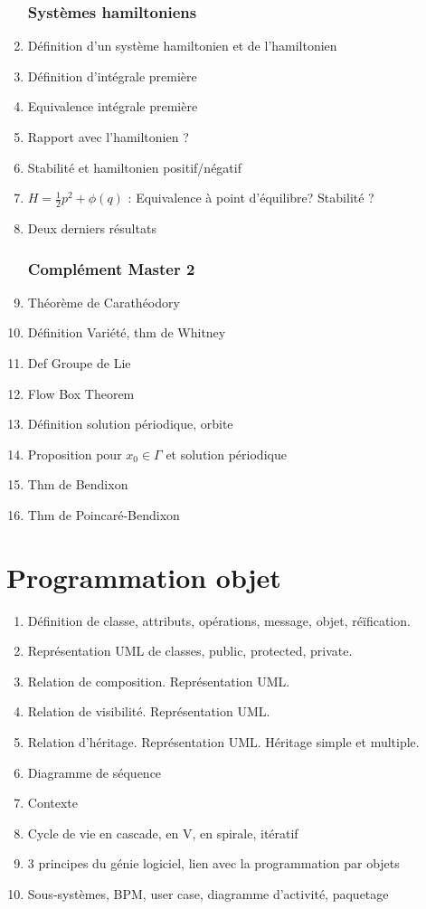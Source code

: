 \documentclass{article}
\begin{document}
\begin{enumerate}
\section{Systèmes hamiltoniens}
\item Définition d'un système hamiltonien et de l'hamiltonien
\item Définition d'intégrale première
\item Equivalence intégrale première
\item Rapport avec l'hamiltonien ?
\item Stabilité et hamiltonien positif/négatif
\item $H=\frac{1}{2}p^2+\phi(q)$ : Equivalence à point d'équilibre? Stabilité ?
\item Deux derniers résultats
\section{Complément Master 2}
\item Théorème de Carathéodory
\item Définition Variété, thm de Whitney
\item Def Groupe de Lie
\item Flow Box Theorem
\item Définition solution périodique, orbite
\item Proposition pour $x_0\in\Gamma$ et solution périodique
\item Thm de Bendixon
\item Thm de Poincaré-Bendixon
\end{enumerate}

\newpage
\part{Programmation objet}
\begin{enumerate}
\item Définition de classe, attributs, opérations, message, objet, réïfication.
\item Représentation UML de classes, public, protected, private.
\item Relation de composition. Représentation UML.
\item Relation de visibilité. Représentation UML.
\item Relation d'héritage. Représentation UML. Héritage simple et multiple.
\item Diagramme de séquence
\item Contexte
\item Cycle de vie en cascade, en V, en spirale, itératif
\item 3 principes du génie logiciel, lien avec la programmation par objets
\item Sous-systèmes, BPM, user case, diagramme d'activité, paquetage
\end{enumerate}
\end{document}
